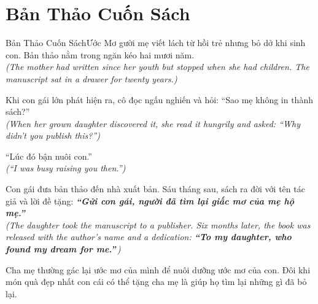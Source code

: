 \section{Bản Thảo Cuốn Sách}
\begin{truyen}{Bản Thảo Cuốn Sách}{Ước Mơ}
gười mẹ viết lách từ hồi trẻ nhưng bỏ dở khi sinh con. Bản thảo nằm trong ngăn kéo hai mươi năm.\\
\textit{(The mother had written since her youth but stopped when she had children. The manuscript sat in a drawer for twenty years.)}

Khi con gái lớn phát hiện ra, cô đọc ngấu nghiến và hỏi: ``Sao mẹ không in thành sách?''\\
\textit{(When her grown daughter discovered it, she read it hungrily and asked: ``Why didn't you publish this?'')}

``Lúc đó bận nuôi con.''\\
\textit{(``I was busy raising you then.'')}

Con gái đưa bản thảo đến nhà xuất bản. Sáu tháng sau, sách ra đời với tên tác giả và lời đề tặng: \textbf{\textit{``Gửi con gái, người đã tìm lại giấc mơ của mẹ hộ mẹ.''}}\,\\
\textit{(The daughter took the manuscript to a publisher. Six months later, the book was released with the author's name and a dedication: \textbf{\textit{``To my daughter, who found my dream for me.''}}\,)}
\end{truyen}
\begin{baihoc}
  Cha mẹ thường gác lại ước mơ của mình để nuôi dưỡng ước mơ của con. Đôi khi món quà đẹp nhất con cái có thể tặng cha mẹ là giúp họ tìm lại những gì đã bỏ lại.
\end{baihoc}

